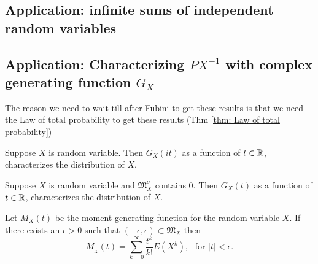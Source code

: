 \subsection{Application: infinite sums of independent random variables}



\subsection{Application: Characterizing $PX^{-1}$ with complex generating function $G_X$}



The reason we need to wait till after Fubini to get these results is that we need the Law of total probability to get these results (Thm \ref{thm: Law of total probability})


\begin{theorem}
Suppose $X$ is random variable.  Then
$G_X(it)$ as a function of $t\in \Bbb R$, characterizes the distribution of $X$.
\end{theorem}


\begin{theorem}
Suppose $X$ is random variable and  $\mathfrak M_X^o$ contains $0$. Then $G_X(t)$ as a function of $t\in \Bbb R$, characterizes the distribution of $X$.
\end{theorem}











\begin{theorem}
Let $M_{X}(t)$ be the moment generating function for the random variable $X$.   If there exists an $\epsilon>0$ such that $(-\epsilon,\epsilon)\subset \mathfrak M_X$ then
\[ M_{_X}(t)= \sum_{k=0}^\infty \frac{t^k}{k!} E(X^k),\,\,\text{ for $|t|<\epsilon$.} \]
\end{theorem}


